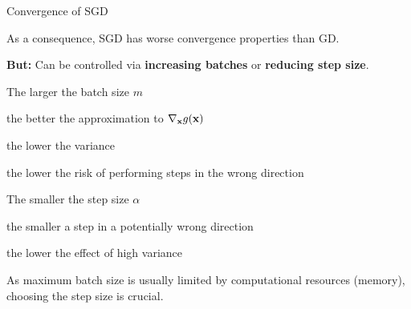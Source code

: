 \documentclass[11pt,compress,t,notes=noshow, xcolor=table]{beamer}
\begin{document}
\begin{vbframe}{Convergence of SGD}

As a consequence, SGD has worse convergence properties than GD. 

\medskip

\textbf{But:} Can be controlled via \textbf{increasing batches} or \textbf{reducing step size}. 

\begin{blocki}{The larger the batch size $m$}
    \vspace{-0.5em}
    \item the better the approximation to $\nabla_{\mathbf{x}} g(\mathbf{x})$
    \item the lower the variance
    \item the lower the risk of performing steps in the wrong direction
\end{blocki}

\begin{blocki}{The smaller the step size $\alpha$}
    \vspace{-0.5em}
    \item the smaller a step in a potentially wrong direction 
    \item the lower the effect of high variance
\end{blocki}

As maximum batch size is usually limited by computational resources (memory), choosing the step size is crucial. 

\end{vbframe}



\endlecture
\end{document}

